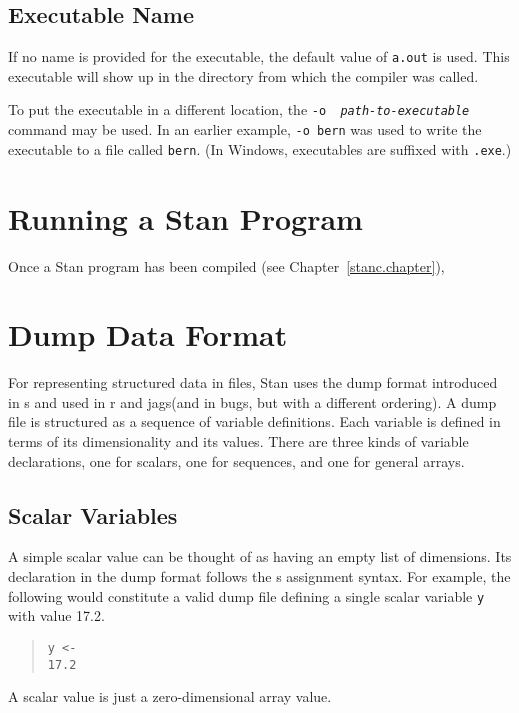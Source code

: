 \documentclass[10pt]{report}
\newcommand{\Stan}{Stan\xspace}
\newcommand{\acronym}[1]{{\sc #1}\xspace}
\newcommand{\R}{\acronym{r}}
\newcommand{\SPLUS}{\acronym{s}}
\newcommand{\BUGS}{\acronym{bugs}}
\newcommand{\JAGS}{\acronym{jags}}
\newcommand{\code}[1]{{\tt #1}}
\newcommand{\refchapter}[1]{Chapter~\ref{#1.chapter}}
\begin{document}
\section{Executable Name}

If no name is provided for the executable, the default value of
\code{a.out} is used.  This executable will show up in the directory
from which the compiler was called.

To put the executable in a different location, the \code{-o {\slshape
    path-to-executable}} command may be used.  In an earlier example,
\code{-o bern} was used to write the executable to a file called
\code{bern}.  (In Windows, executables are suffixed with \code{.exe}.)



\chapter{Running a \Stan Program}\label{stan-cmd.chapter}

Once a \Stan program has been compiled (see \refchapter{stanc}), 









\chapter{Dump Data Format}\label{dump.chapter}

For representing structured data in files, \Stan uses the dump format
introduced in \SPLUS and used in \R and \JAGS (and in \BUGS, but with
a different ordering).   A dump file is structured as a sequence of
variable definitions.  Each variable is defined in terms of its
dimensionality and its values.   There are three kinds of variable
declarations, one for scalars, one for sequences, and one for general
arrays.

\section{Scalar Variables}

A simple scalar value can be thought of as having an empty list of
dimensions.  Its declaration in the dump format follows the \SPLUS
assignment syntax.  For example, the following would constitute a
valid dump file defining a single scalar variable \code{y} with value
17.2.
%
\begin{quote}
\begin{Verbatim}
y <- 
17.2
\end{Verbatim}
\end{quote}
%
A scalar value is just a zero-dimensional array value.
\end{document}
